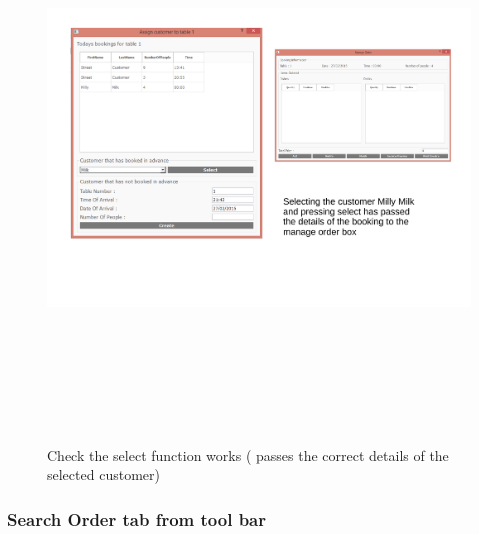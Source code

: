 \begin{landscape}
\begin{figure}[H]
    \includegraphics[height = 15cm]{./Testing/images/testt1.pdf}
    \caption{Check the select function works ( passes the correct details of the selected customer)} \label{fig:Test1}
\end{figure}

\subsubsection{Search Order tab from tool bar}


\end{landscape}
